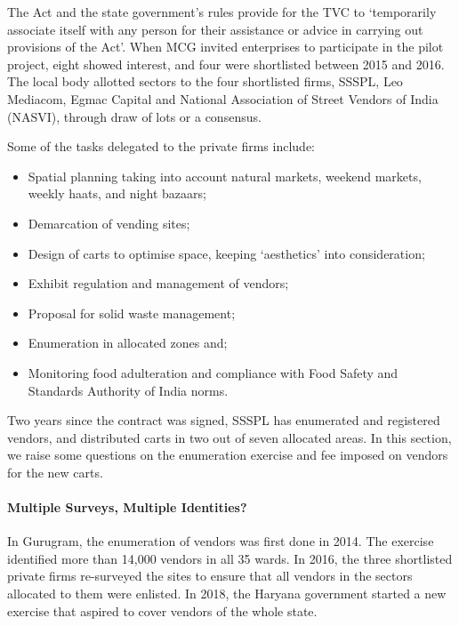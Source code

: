 \documentclass[a4paper, 12pt, twoside, table]{article}
\begin{document}
{{The Act and the state government’s rules provide for the TVC to `temporarily associate itself with any person for their assistance or advice in carrying out provisions of the Act'. When MCG invited enterprises to participate in the pilot project, eight showed interest, and four were shortlisted between 2015 and 2016. The local body allotted sectors to the four shortlisted firms, SSSPL, Leo Mediacom, Egmac Capital and National Association of Street Vendors of India (NASVI), through draw of lots or a consensus.

Some of the tasks delegated to the private firms include:
\begin{itemize}
\item Spatial planning taking into account natural markets, weekend markets, weekly haats, and night bazaars;
\item Demarcation of vending sites;
\item Design of carts to optimise space, keeping `aesthetics' into consideration;
\item Exhibit regulation and management of vendors;
\item Proposal for solid waste management;
\item Enumeration in allocated zones and;
\item Monitoring food adulteration and compliance with Food Safety and Standards Authority of India norms.
\end{itemize}

Two years since the contract was signed, SSSPL has enumerated and registered vendors, and distributed carts in two out of seven allocated areas. In this section, we raise some questions on the enumeration exercise and fee imposed on vendors for the new carts.

\paragraph*{Multiple Surveys, Multiple Identities?} 

In Gurugram, the enumeration of vendors was first done in 2014. The exercise identified more than 14,000 vendors in all 35 wards. In 2016, the three shortlisted private firms re-surveyed the sites to ensure that all vendors in the sectors allocated to them were enlisted. In 2018, the Haryana government started a new exercise that aspired to cover vendors of the whole state. \\

}}
\end{document}
